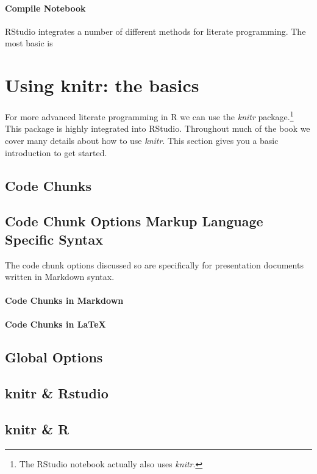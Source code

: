 \documentclass[ChapterTOCs,krantz1]{krantz}\usepackage{graphicx, color}
\begin{document}
\paragraph{Compile Notebook}

RStudio integrates a number of different methods for literate programming. The most basic is 

\section{Using knitr: the basics}

For more advanced literate programming in R we can use the {\emph{knitr}} package.\footnote{The RStudio notebook actually also uses {\emph{knitr}}.} This package is highly integrated into RStudio. Throughout much of the book we cover many details about how to use {\emph{knitr}}. This section gives you a basic introduction to get started.

\subsection{Code Chunks}

\subsection{Code Chunk Options Markup Language Specific Syntax}

The code chunk options discussed so are specifically for presentation documents written in Markdown syntax. 

\paragraph{Code Chunks in Markdown}

\paragraph{Code Chunks in \LaTeX}

\subsection{Global Options}

\subsection{knitr \& Rstudio}

\subsection{knitr \& R}
\end{document}
